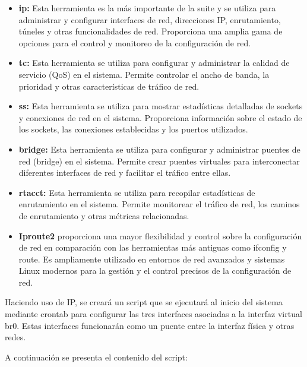 		\begin{itemize}
			
			\item\textbf{ip:} Esta herramienta es la más importante de la suite y se utiliza para administrar y configurar interfaces de red, direcciones IP, enrutamiento, túneles y otras funcionalidades de red. Proporciona una amplia gama de opciones para el control y monitoreo de la configuración de red.
		
			\item\textbf{tc:} Esta herramienta se utiliza para configurar y administrar la calidad de servicio (QoS) en el sistema. Permite controlar el ancho de banda, la prioridad y otras características de tráfico de red.
		
			\item\textbf{ss:} Esta herramienta se utiliza para mostrar estadísticas detalladas de sockets y conexiones de red en el sistema. Proporciona información sobre el estado de los sockets, las conexiones establecidas y los puertos utilizados.
		
			\item\textbf{bridge:} Esta herramienta se utiliza para configurar y administrar puentes de red (bridge) en el sistema. Permite crear puentes virtuales para interconectar diferentes interfaces de red y facilitar el tráfico entre ellas.
		
			\item\textbf{rtacct:} Esta herramienta se utiliza para recopilar estadísticas de enrutamiento en el sistema. Permite monitorear el tráfico de red, los caminos de enrutamiento y otras métricas relacionadas.
		
			\item\textbf{Iproute2} proporciona una mayor flexibilidad y control sobre la configuración de red en comparación con las herramientas más antiguas como ifconfig y route. Es ampliamente utilizado en entornos de red avanzados y sistemas Linux modernos para la gestión y el control precisos de la configuración de red.
		
			\end{itemize}
		
		
		Haciendo uso de IP, se creará un script que se ejecutará al inicio del sistema mediante crontab para configurar las tres interfaces 	asociadas a la interfaz virtual br0. Estas interfaces funcionarán como un puente entre la interfaz física y otras redes.\par
	
		A continuación se presenta el contenido del script:
	
